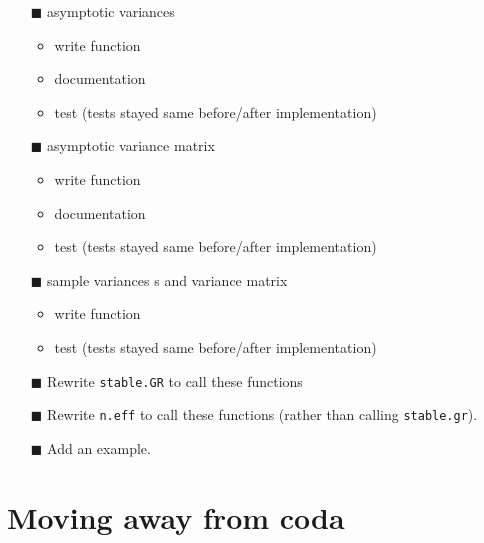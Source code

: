 \documentclass[12pt]{article}
\theoremstyle{remark}
\begin{document}
\begin{itemize}
 \renewcommand{\labelitemi}{$\square$}
\item[$\blacksquare$]   asymptotic variances
\begin{itemize}
\item write function \checkmark
\item documentation \checkmark
\item test \checkmark (tests stayed same before/after implementation)
\end{itemize}

\item[$\blacksquare$]   asymptotic variance matrix
\begin{itemize}
\item write function \checkmark
\item documentation \checkmark
\item test \checkmark (tests stayed same before/after implementation)
\end{itemize}

\item[$\blacksquare$]   sample variances s and variance matrix
\begin{itemize}
\item write function \checkmark
\item test \checkmark (tests stayed same before/after implementation)
\end{itemize}

\item[$\blacksquare$]  Rewrite \texttt{stable.GR} to call these functions



\item[$\blacksquare$] Rewrite \texttt{n.eff} to call these functions (rather than calling \texttt{stable.gr}).

\item[$\blacksquare$] Add an example.

\end{itemize}





\section{\textbf{Moving away from coda \checkmark}}
\end{document}
